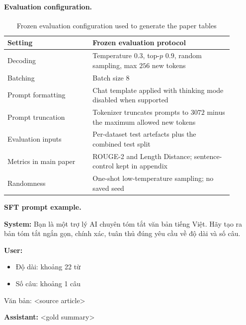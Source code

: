 \documentclass[11pt]{article}
\newcommand{\vn}[1]{{\vietfont #1}}
\newenvironment{vnblock}{\begingroup\vietfont}{\endgroup}
\begin{document}
\paragraph{Evaluation configuration.}
\begin{table}[H]
\centering
\caption{Frozen evaluation configuration used to generate the paper tables}
\label{tab:appendix-eval-config}
\small
\begin{tabular}{L{0.34\linewidth}L{0.56\linewidth}}
\toprule
Setting & Frozen evaluation protocol \\
\midrule
Decoding & Temperature $0.3$, top-$p$ $0.9$, random sampling, max $256$ new tokens \\
Batching & Batch size $8$ \\
Prompt formatting & Chat template applied with thinking mode disabled when supported \\
Prompt truncation & Tokenizer truncates prompts to $3072$ minus the maximum allowed new tokens \\
Evaluation inputs & Per-dataset test artefacts plus the combined test split \\
Metrics in main paper & ROUGE-2 and Length Distance; sentence-control kept in appendix \\
Randomness & One-shot low-temperature sampling; no saved seed \\
\bottomrule
\end{tabular}
\end{table}

\noindent\textbf{SFT prompt example.}\par\smallskip
\noindent\colorbox{promptbg}{%
\begin{minipage}{\dimexpr\textwidth-2\fboxsep\relax}
\small\vspace{4pt}
\textbf{System:} \vn{Bạn là một trợ lý AI chuyên tóm tắt văn bản tiếng Việt. Hãy tạo ra bản tóm tắt ngắn gọn, chính xác, tuân thủ đúng yêu cầu về độ dài và số câu.}

\smallskip
\textbf{User:}
\begin{vnblock}
\begin{itemize}
  \item Độ dài: khoảng 22 từ
  \item Số câu: khoảng 1 câu
\end{itemize}
\vn{Văn bản:} \textless{}source article\textgreater
\end{vnblock}

\smallskip
\textbf{Assistant:}
\textless{}gold summary\textgreater
\vspace{4pt}
\end{minipage}}
\end{document}
